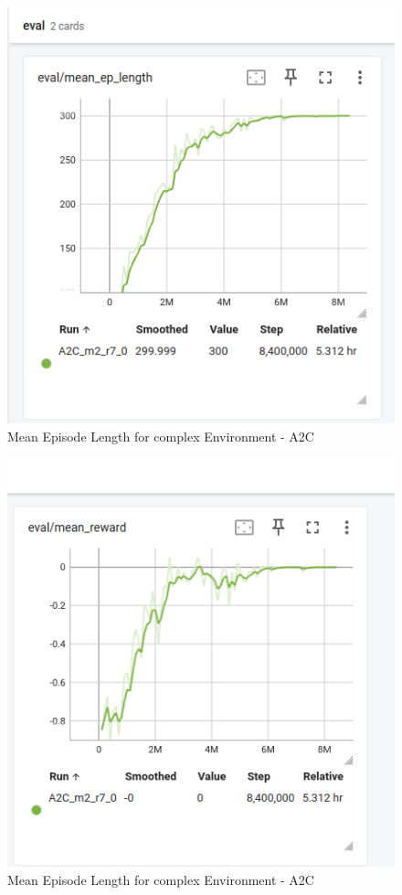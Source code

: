 \documentclass[conference]{IEEEtran}
\begin{document}
\begin{itemize}
\begin{figure}[!htb]
\centering
\includegraphics[width=0.8\columnwidth,keepaspectratio]{RL_project_update/A2C_results1.png}
\caption{Mean Episode Length for complex Environment - A2C}
\label{fig:your_label}
\end{figure}

\begin{figure}[!htb]
\centering
\includegraphics[width=0.8\columnwidth,keepaspectratio]{RL_project_update/A2C_results2.png}
\caption{Mean Episode Length for complex Environment - A2C}
\label{fig:your_label}
\end{figure}

\end{itemize}
\end{document}
